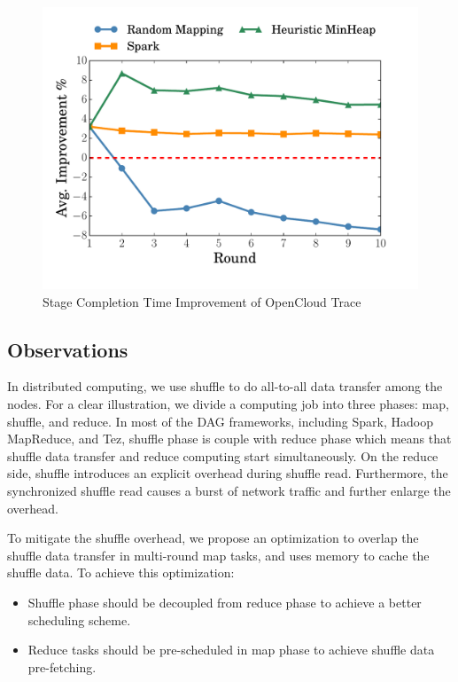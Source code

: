 \begin{figure}
	\centering
	\includegraphics[width=.6\linewidth]{fig/sim} %
	\caption{Stage Completion Time Improvement of OpenCloud Trace}
	\label{fig:sim}
\end{figure}

{\color{black}
\subsection{Observations}\label{observation}

In distributed computing, we use shuffle to do all-to-all data transfer among the nodes.
For a clear illustration, we divide a computing job into three phases: map, shuffle, and reduce.
In most of the DAG frameworks, including Spark, Hadoop MapReduce, and Tez, shuffle phase is couple with reduce phase which means that shuffle data transfer and reduce computing start simultaneously.
On the reduce side, shuffle introduces an explicit overhead during shuffle read.
Furthermore, the synchronized shuffle read causes a burst of network traffic and further enlarge the overhead.

To mitigate the shuffle overhead, we propose an optimization to overlap the shuffle data transfer in multi-round map tasks, and uses memory to cache the shuffle data. To achieve this optimization:
\begin{itemize}
	\item Shuffle phase should be decoupled from reduce phase to achieve a better scheduling scheme.
	\item Reduce tasks should be pre-scheduled in map phase to achieve shuffle data pre-fetching.
\end{itemize}
}


